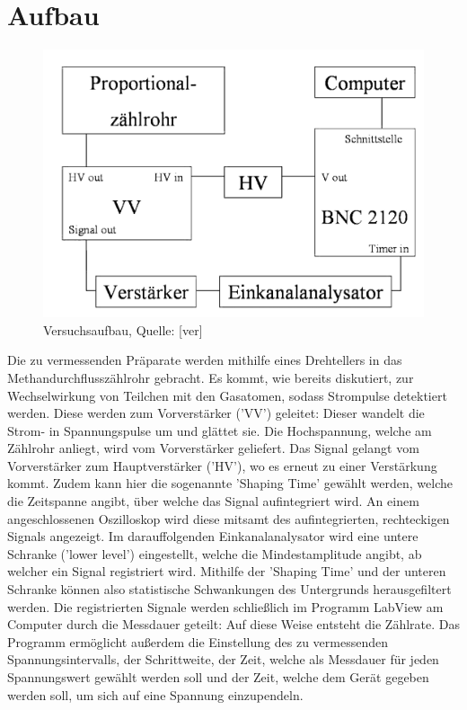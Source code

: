 \clearpage
\section{Aufbau}
\begin{figure}[h]
\begin{center}
\includegraphics[scale=0.4]{Bilder/aufbau}
\caption{Versuchsaufbau, Quelle: [ver]}
\end{center}
\end{figure}
Die zu vermessenden Präparate werden mithilfe eines Drehtellers in das Methandurchflusszählrohr gebracht. Es kommt, wie bereits diskutiert, zur Wechselwirkung von Teilchen mit den Gasatomen, sodass Strompulse detektiert werden. Diese werden zum Vorverstärker ('VV') geleitet: Dieser wandelt die Strom- in Spannungspulse um und glättet sie. Die Hochspannung, welche am Zählrohr anliegt, wird vom Vorverstärker geliefert. Das Signal gelangt vom Vorverstärker zum Hauptverstärker ('HV'), wo es erneut zu einer Verstärkung kommt. Zudem kann hier die sogenannte 'Shaping Time' gewählt werden, welche die Zeitspanne angibt, über welche das Signal aufintegriert wird. An einem angeschlossenen Oszilloskop wird diese mitsamt des aufintegrierten, rechteckigen Signals angezeigt. Im darauffolgenden Einkanalanalysator wird eine untere Schranke ('lower level') eingestellt, welche die Mindestamplitude angibt, ab welcher ein Signal registriert wird. Mithilfe der 'Shaping Time' und der unteren Schranke können also statistische Schwankungen des Untergrunds herausgefiltert werden. Die registrierten Signale werden schließlich im Programm LabView am Computer durch die Messdauer geteilt: Auf diese Weise entsteht die Zählrate. Das Programm ermöglicht außerdem die Einstellung des zu vermessenden Spannungsintervalls, der Schrittweite, der Zeit, welche als Messdauer für jeden Spannungswert gewählt werden soll und der Zeit, welche dem Gerät gegeben werden soll, um sich auf eine Spannung einzupendeln.
\clearpage
